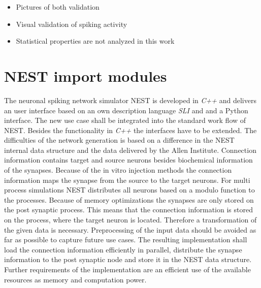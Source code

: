 \begin{itemize}
      \item Pictures of both validation
      \item Visual validation of spiking activity
      \item Statistical properties are not analyzed in this work 
\end{itemize}

\section{NEST import modules}
The neuronal spiking network simulator NEST is developed in \emph{C++} and delivers
an user interface based on an own description language \emph{SLI} and  and a Python interface.
The new use case shall be integrated into the standard work flow of NEST.
Besides the functionality in \emph{C++} the interfaces have to be extended.
The difficulties of the network generation is based on a difference in 
the NEST internal data structure and the data delivered by the Allen Institute.
Connection information contains target and source neurons besides biochemical
information of the synapses. Because of the in vitro injection methods the
connection information maps the synapse from the source to the target neurons.
For multi process simulations NEST distributes all neurons based on a modulo function 
to the processes. Because of memory optimizations the synapses are only stored on the
post synaptic process. This means that the connection information is stored
on the process, where the target neuron is located. Therefore a transformation of the given data is
necessary. Preprocessing of the input data should be avoided as far as possible to capture
future use cases.
The resulting implementation shall load the connection information efficiently in parallel,
distribute the synapse information to the post synaptic node and store it in
the NEST data structure.
Further requirements of the implementation are an efficient use of the available resources as
memory and computation power. 



